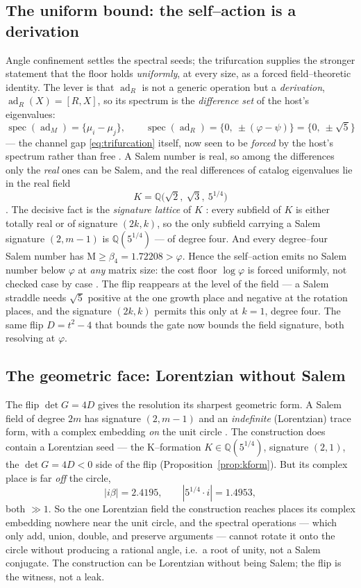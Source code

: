 \documentclass[11pt]{article}
\theoremstyle{plain}
\theoremstyle{definition}
\theoremstyle{remark}
\newcommand{\Q}{\mathbb{Q}}
\newcommand{\Mah}{\mathrm{M}}
\newcommand{\abs}[1]{\left\lvert #1 \right\rvert}
\begin{document}
\subsection{The uniform bound: the self--action is a derivation}\label{ssec:uniform}

Angle confinement settles the spectral seeds; the trifurcation supplies the stronger statement that the floor holds \emph{uniformly}, at every size, as a forced field--theoretic identity. The lever is that $\operatorname{ad}_R$ is not a generic operation but a \emph{derivation}, $\operatorname{ad}_R(X)=[R,X]$, so its spectrum is the \emph{difference set} of the host's eigenvalues:
\[
\operatorname{spec}(\operatorname{ad}_M)=\{\mu_i-\mu_j\},\qquad \operatorname{spec}(\operatorname{ad}_R)=\{0,\ \pm(\varphi-\psi)\}=\{0,\ \pm\sqrt5\}
\]
--- the channel gap \eqref{eq:trifurcation} itself, now seen to be \emph{forced} by the host's spectrum rather than free \cite[Lem 10.2]{EG}. A Salem number is real, so among the differences only the \emph{real} ones can be Salem, and the real differences of catalog eigenvalues lie in the real field
\[
K=\Q\bigl(\sqrt2,\ \sqrt3,\ 5^{1/4}\bigr)
\]
\cite[Lem 10.4]{EG}. The decisive fact is the \emph{signature lattice} of $K$ \cite[Thm 10.5]{EG}: every subfield of $K$ is either totally real or of signature $(2k,k)$, so the only subfield carrying a Salem signature $(2,m-1)$ is $\Q(5^{1/4})$ --- of degree four. And every degree--four Salem number has $\Mah\ge\beta_4=1.72208>\varphi$. Hence the self--action emits no Salem number below $\varphi$ at \emph{any} matrix size: the cost floor $\log\varphi$ is forced uniformly, not checked case by case \cite[Thm 10.7]{EG}. The flip reappears at the level of the field --- a Salem straddle needs $\sqrt5$ positive at the one growth place and negative at the rotation places, and the signature $(2k,k)$ permits this only at $k=1$, degree four. The same flip $D=t^2-4$ that bounds the gate now bounds the field signature, both resolving at $\varphi$.

\subsection{The geometric face: Lorentzian without Salem}\label{ssec:kformface}

The flip $\det G=4D$ gives the resolution its sharpest geometric form. A Salem field of degree $2m$ has signature $(2,m-1)$ and an \emph{indefinite} (Lorentzian) trace form, with a complex embedding \emph{on} the unit circle \cite[Prop 8.2]{EG}. The construction does contain a Lorentzian seed --- the K--formation $K\in\Q(5^{1/4})$, signature $(2,1)$, the $\det G=4D<0$ side of the flip (Proposition~\ref{prop:kform}). But its complex place is far \emph{off} the circle,
\[
\abs{i\beta}=2.4195,\qquad \abs{5^{1/4}\cdot i}=1.4953,
\]
both $\gg1$. So the one Lorentzian field the construction reaches places its complex embedding nowhere near the unit circle, and the spectral operations --- which only add, union, double, and preserve arguments --- cannot rotate it onto the circle without producing a rational angle, i.e.\ a root of unity, not a Salem conjugate. The construction can be Lorentzian without being Salem; the flip is the witness, not a leak.
\end{document}
